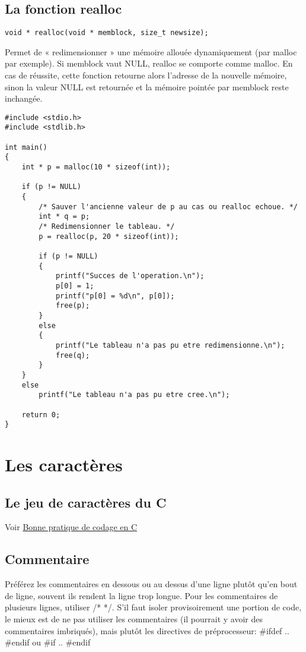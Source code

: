 \documentclass[a4paper]{article}
\begin{document}
\subsection{La fonction realloc}
\begin{lstlisting}
void * realloc(void * memblock, size_t newsize);
\end{lstlisting}
Permet de « redimensionner » une mémoire allouée dynamiquement (par malloc par exemple). Si memblock vaut NULL, realloc se comporte comme malloc. En cas de réussite, cette fonction retourne alors l'adresse de la nouvelle mémoire, sinon la valeur NULL est retournée et la mémoire pointée par memblock reste inchangée.
\begin{lstlisting}
#include <stdio.h>
#include <stdlib.h>

int main()
{
    int * p = malloc(10 * sizeof(int));

    if (p != NULL)
    {
        /* Sauver l'ancienne valeur de p au cas ou realloc echoue. */
        int * q = p;
        /* Redimensionner le tableau. */
        p = realloc(p, 20 * sizeof(int));

        if (p != NULL)
        {
            printf("Succes de l'operation.\n");
            p[0] = 1;
            printf("p[0] = %d\n", p[0]);
            free(p);
        }
        else
        {
            printf("Le tableau n'a pas pu etre redimensionne.\n");
            free(q);
        }
    }
    else
        printf("Le tableau n'a pas pu etre cree.\n");

    return 0;
}
\end{lstlisting}
\section{Les caractères}
\subsection{Le jeu de caractères du C}
Voir \href{http://emmanuel-delahaye.developpez.com/tutoriels/c/bonnes-pratiques-codage-c/#LI-A}{Bonne pratique de codage en C}
\subsection{Commentaire}
Préférez les commentaires en dessous ou au dessus d'une ligne plutôt qu'en bout de ligne, souvent ils rendent la ligne trop longue. \newline
Pour les commentaires de plusieurs lignes, utiliser /* */.\newline
S'il faut isoler provisoirement une portion de code, le mieux est de ne pas utiliser les commentaires (il pourrait y avoir des commentaires imbriqués), mais plutôt les directives de préprocesseur: \#ifdef .. \#endif ou \#if .. \#endif
\end{document}
